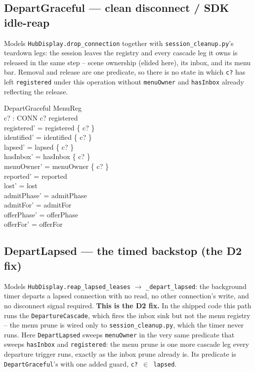 \documentclass[a4paper,10pt,fleqn]{article}
\begin{document}
\subsection{DepartGraceful --- clean disconnect / SDK idle-reap}
\label{sec:departgraceful}

Models \texttt{HubDisplay.drop\_connection} together with
\texttt{session\_cleanup.py}'s teardown legs: the session leaves the
registry and every cascade leg it owns is released in the same step -- scene
ownership (elided here), its inbox, and its menu bar. Removal and release
are one predicate, so there is no state in which \texttt{c?} has left
\texttt{registered} under this operation without \texttt{menuOwner} and
\texttt{hasInbox} already reflecting the release.

\begin{schema}{DepartGraceful}
  \Delta MenuReg \\
  c? : CONN
\where
  c? \in registered \\
  registered' = registered \setminus \{ c? \} \\
  identified' = identified \setminus \{ c? \} \\
  lapsed' = lapsed \setminus \{ c? \} \\
  hasInbox' = hasInbox \setminus \{ c? \} \\
  menuOwner' = menuOwner \setminus \{ c? \} \\
  reported' = reported \\
  lost' = lost \\
  admitPhase' = admitPhase \\
  admitFor' = admitFor \\
  offerPhase' = offerPhase \\
  offerFor' = offerFor
\end{schema}

\subsection{DepartLapsed --- the timed backstop (the D2 fix)}
\label{sec:departlapsed}

Models \texttt{HubDisplay.reap\_lapsed\_leases} $\to$
\texttt{\_depart\_lapsed}: the background timer departs a lapsed connection
with no read, no other connection's write, and no disconnect signal
required. \textbf{This is the D2 fix.} In the shipped code this path runs
the \texttt{DepartureCascade}, which fires the inbox sink but not the menu
registry -- the menu prune is wired only to \texttt{session\_cleanup.py},
which the timer never runs. Here \texttt{DepartLapsed} sweeps
\texttt{menuOwner} in the very same predicate that sweeps \texttt{hasInbox}
and \texttt{registered}: the menu prune is one more cascade leg every
departure trigger runs, exactly as the inbox prune already is. Its predicate
is \texttt{DepartGraceful}'s with one added guard, \texttt{c? $\in$ lapsed}.
\end{document}
